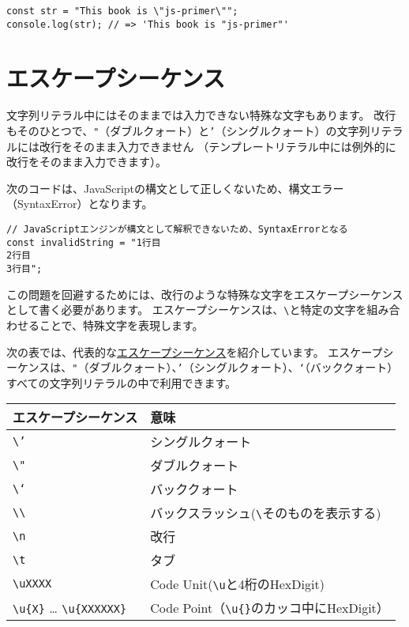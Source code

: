 \begin{lstlisting}
const str = "This book is \"js-primer\"";
console.log(str); // => 'This book is "js-primer"'
\end{lstlisting}

\hypertarget{escape-sequence}{%
\section{エスケープシーケンス}\label{escape-sequence}}

文字列リテラル中にはそのままでは入力できない特殊な文字もあります。
改行もそのひとつで、\texttt{"}（ダブルクォート）と\texttt{'}（シングルクォート）の文字列リテラルには改行をそのまま入力できません
（テンプレートリテラル中には例外的に改行をそのまま入力できます）。

次のコードは、JavaScriptの構文として正しくないため、構文エラー（SyntaxError）となります。

\begin{lstlisting}
// JavaScriptエンジンが構文として解釈できないため、SyntaxErrorとなる
const invalidString = "1行目
2行目
3行目";
\end{lstlisting}

この問題を回避するためには、改行のような特殊な文字をエスケープシーケンスとして書く必要があります。
エスケープシーケンスは、\texttt{\textbackslash}と特定の文字を組み合わせることで、特殊文字を表現します。

次の表では、代表的な\href{https://developer.mozilla.org/ja/docs/Web/JavaScript/Reference/Global_Objects/String\#\%E3\%82\%A8\%E3\%82\%B9\%E3\%82\%B1\%E3\%83\%BC\%E3\%83\%97\%E3\%82\%B7\%E3\%83\%BC\%E3\%82\%B1\%E3\%83\%B3\%E3\%82\%B9}{エスケープシーケンス}を紹介しています。
エスケープシーケンスは、\texttt{"}（ダブルクォート）、\texttt{'}（シングルクォート）、\texttt{`}（バッククォート）すべての文字列リテラルの中で利用できます。

\begin{longtable}[]{@{}ll@{}}
\toprule
エスケープシーケンス & 意味\tabularnewline
\midrule
\endhead
\texttt{\textbackslash'} & シングルクォート\tabularnewline
\texttt{\textbackslash"} & ダブルクォート\tabularnewline
\texttt{\textbackslash`} & バッククォート\tabularnewline
\texttt{\textbackslash\textbackslash} & バックスラッシュ(\texttt{\textbackslash}そのものを表示する)\tabularnewline
\texttt{\textbackslash n} & 改行\tabularnewline
\texttt{\textbackslash t} & タブ\tabularnewline
\texttt{\textbackslash uXXXX} & Code Unit(\texttt{\textbackslash u}と4桁のHexDigit)\tabularnewline
\texttt{\textbackslash u\{X\}} \ldots{} \texttt{\textbackslash u\{XXXXXX\}} & Code Point（\texttt{\textbackslash u\{\}}のカッコ中にHexDigit）\tabularnewline
\bottomrule
\end{longtable}

